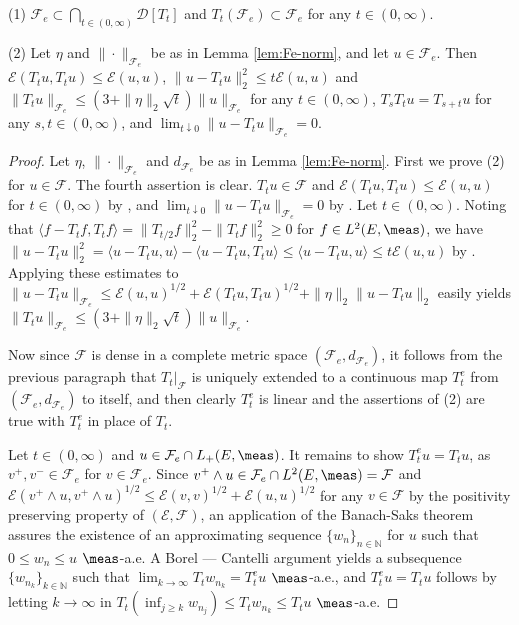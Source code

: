 %
\begin{lem}\label{lem:Fe-Tt}
\textup{(1)} $\mathcal{F}_{e}\subset\bigcap_{t\in(0,\infty)}\mathcal{D}[T_{t}]$ and
$T_{t}(\mathcal{F}_{e})\subset\mathcal{F}_{e}$ for any $t\in(0,\infty)$.

\noindent
\textup{(2)} Let $\eta$ and $\|\cdot\|_{\mathcal{F}_{e}}$ be as in Lemma \textup{\ref{lem:Fe-norm}},
and let $u\in\mathcal{F}_{e}$. Then
$\mathcal{E}(T_{t}u,T_{t}u)\leq\mathcal{E}(u,u)$,
$\|u-T_{t}u\|_{2}^{2}\leq t\mathcal{E}(u,u)$ and
$\|T_{t}u\|_{\mathcal{F}_{e}}\leq(3+\|\eta\|_{2}\sqrt{t})\|u\|_{\mathcal{F}_{e}}$
for any $t\in(0,\infty)$, $T_{s}T_{t}u=T_{s+t}u$ for any $s,t\in(0,\infty)$,
and $\lim_{t\downarrow 0}\|u-T_{t}u\|_{\mathcal{F}_{e}}=0$.
\end{lem}
%
\begin{proof}
Let $\eta$, $\|\cdot\|_{\mathcal{F}_{e}}$ and $d_{\mathcal{F}_{e}}$
be as in Lemma \ref{lem:Fe-norm}.
First we prove (2) for $u\in\mathcal{F}$. The fourth assertion is clear.
$T_{t}u\in\mathcal{F}$ and $\mathcal{E}(T_{t}u,T_{t}u)\leq\mathcal{E}(u,u)$
for $t\in(0,\infty)$ by \cite[Lemma 1.3.3-(i)]{FOT}, and
$\lim_{t\downarrow 0}\|u-T_{t}u\|_{\mathcal{F}_{e}}=0$ by \cite[Lemma 1.3.3-(iii)]{FOT}.
Let $t\in(0,\infty)$. Noting that
$\langle f-T_{t}f,T_{t}f\rangle=\|T_{t/2}f\|_{2}^{2}-\|T_{t}f\|_{2}^{2}\geq 0$
for $f\in L^{2}(E,\meas)$, we have
$\|u-T_{t}u\|_{2}^{2}=\langle u-T_{t}u,u\rangle-\langle u-T_{t}u,T_{t}u\rangle
	\leq\langle u-T_{t}u,u\rangle\leq t\mathcal{E}(u,u)$
by \cite[Lemma 1.3.4-(i)]{FOT}. Applying these estimates to
$\|u-T_{t}u\|_{\mathcal{F}_{e}}
	\leq\mathcal{E}(u,u)^{1/2}+\mathcal{E}(T_{t}u,T_{t}u)^{1/2}+\|\eta\|_{2}\|u-T_{t}u\|_{2}$
easily yields
$\|T_{t}u\|_{\mathcal{F}_{e}}\leq(3+\|\eta\|_{2}\sqrt{t})\|u\|_{\mathcal{F}_{e}}$.

Now since $\mathcal{F}$ is dense in a complete metric space
$(\mathcal{F}_{e},d_{\mathcal{F}_{e}})$, it follows from the previous paragraph
that $T_{t}|_{\mathcal{F}}$ is uniquely extended to a continuous map
$T^{e}_{t}$ from $(\mathcal{F}_{e},d_{\mathcal{F}_{e}})$ to itself, and
then clearly $T^{e}_{t}$ is linear and the assertions of (2) are true
with $T^{e}_{t}$ in place of $T_{t}$.

Let $t\in(0,\infty)$ and $u\in\mathcal{F}_{e}\cap L_{+}(E,\meas)$.
It remains to show $T^{e}_{t}u=T_{t}u$, as $v^{+},v^{-}\in\mathcal{F}_{e}$
for $v\in\mathcal{F}_{e}$. Since
$v^{+}\wedge u\in\mathcal{F}_{e}\cap L^{2}(E,\meas)=\mathcal{F}$ and
$\mathcal{E}(v^{+}\wedge u,v^{+}\wedge u)^{1/2}\leq\mathcal{E}(v,v)^{1/2}+\mathcal{E}(u,u)^{1/2}$
for any $v\in\mathcal{F}$ by the positivity preserving property of $(\mathcal{E},\mathcal{F})$,
an application of the Banach-Saks theorem \cite[Theorem A.4.1-(ii)]{CF} assures
the existence of an approximating sequence $\{w_{n}\}_{n\in\mathbb{N}}$ for $u$
such that $0\leq w_{n}\leq u$ $\meas$-a.e. A Borel --- Cantelli argument yields
a subsequence $\{w_{n_{k}}\}_{k\in\mathbb{N}}$ such that
$\lim_{k\to\infty}T_{t}w_{n_{k}}=T^{e}_{t}u$ $\meas$-a.e.,
and $T^{e}_{t}u=T_{t}u$ follows by letting $k\to\infty$ in
$T_{t}(\inf_{j\geq k}w_{n_{j}})\leq T_{t}w_{n_{k}}\leq T_{t}u$ $\meas$-a.e.
\end{proof}
%

